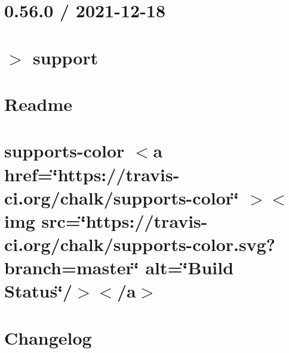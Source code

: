 \documentclass[twoside]{book}
\newcommand{\+}{\discretionary{\mbox{\scriptsize$\hookleftarrow$}}{}{}}
\begin{document}
\chapter{0.56.0 / 2021-\/12-\/18}
\label{md__c___users_vaishnavi_jadhav__desktop__developer_code_mean_stack_example_client_node_modules_stylus__changelog}

\chapter{\texorpdfstring{$>$}{>} support}
\label{_2strong}

\chapter{Readme}
\label{md__c___users_vaishnavi_jadhav__desktop__developer_code_mean_stack_example_client_node_modules_stylus__readme}

\chapter{supports-\/color \texorpdfstring{$<$}{<}a href=\char`\"{}https\+://travis-\/ci.\+org/chalk/supports-\/color\char`\"{} \texorpdfstring{$>$}{>}\texorpdfstring{$<$}{<}img src=\char`\"{}https\+://travis-\/ci.\+org/chalk/supports-\/color.\+svg?branch=master\char`\"{} alt=\char`\"{}\+Build Status\char`\"{}/\texorpdfstring{$>$}{>}\texorpdfstring{$<$}{<}/a\texorpdfstring{$>$}{>}}
\label{md__c___users_vaishnavi_jadhav__desktop__developer_code_mean_stack_example_client_node_modules_supports_color_readme}

\chapter{Changelog}
\label{md__c___users_vaishnavi_jadhav__desktop__developer_code_mean_stack_example_client_node_modules_sf506a6a8657a922569c8d2a89641c886}

\end{document}
